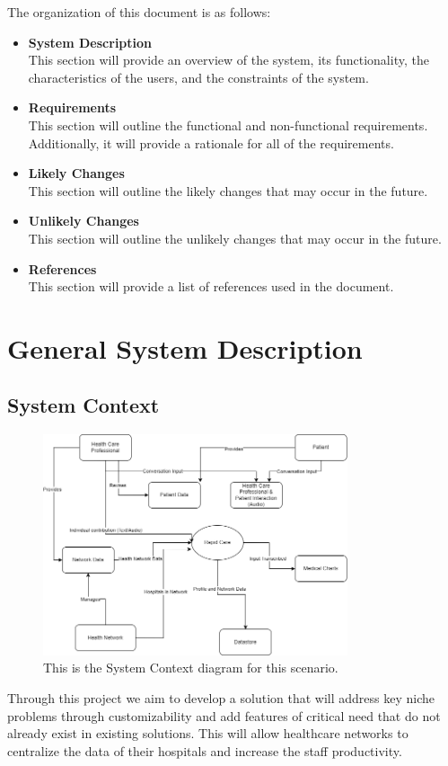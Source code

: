 \documentclass[12pt]{article}
\begin{document}
The organization of this document is as follows:
\begin{itemize}
  \item \textbf{System Description}\\
  This section will provide an overview of the system, its functionality, the characteristics of the users, and the constraints of the system.
  \item \textbf{Requirements}\\
  This section will outline the functional and non-functional requirements. Additionally, it will provide a rationale for all of the requirements.
  \item \textbf{Likely Changes}\\
  This section will outline the likely changes that may occur in the future.
  \item \textbf{Unlikely Changes}\\
  This section will outline the unlikely changes that may occur in the future.
  \item \textbf{References}\\
  This section will provide a list of references used in the document.
\end{itemize}

\section{General System Description} \label{sec_GeneralSystemDescription}

\subsection{System Context} \label{sec_SystemContext}
\begin{figure}[H]
  \includegraphics[width=0.8\textwidth]{System_Context.png}
  \caption{This is the System Context diagram for this scenario.}
\end{figure}
Through this project we aim to develop a solution that will address key niche problems through customizability and add features of critical need that do not already exist in existing solutions. This will allow healthcare networks to centralize the data of their hospitals and increase the staff productivity.\\
\end{document}
